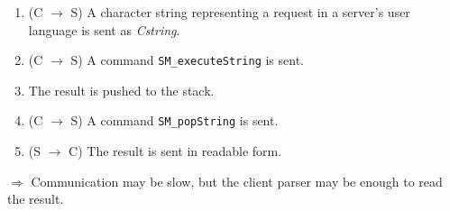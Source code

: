 \documentclass{slides}
\begin{document}
\begin{slide}{}

\begin{enumerate}
\item (C $\rightarrow$ S) A character string representing a request in a server's
user language is sent as {\sl Cstring}.
\item (C $\rightarrow$ S) A command {\tt SM\_executeString} is sent.
\item The result is pushed to the stack.
\item (C $\rightarrow$ S) A command {\tt SM\_popString} is sent.
\item (S $\rightarrow$ C) The result is sent in readable form.
\end{enumerate}

$\Rightarrow$ Communication may be slow, but the client parser may be
enough to read the result.
\end{slide}
\end{document}
